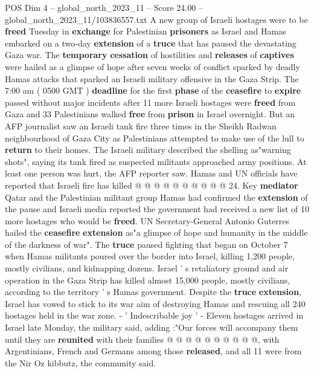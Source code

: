 \begin{textsample}{POS Dim 4 – global\_north\_2023\_11 – Score 24.00 – global\_north\_2023\_11/103836557.txt}  \label{ex:f4_pos_271}
A new group of Israeli hostages were to be \textbf{freed} Tuesday in \textbf{exchange} for Palestinian \textbf{prisoners} as Israel and Hamas embarked on a two-day \textbf{extension} of a \textbf{truce} that has paused the devastating Gaza war.
The \textbf{temporary} \textbf{cessation} of hostilities and \textbf{releases} of \textbf{captives} were hailed as a glimpse of hope after seven weeks of conflict sparked by deadly Hamas attacks that sparked an Israeli military offensive in the Gaza Strip.
The 7:00 am ( 0500 GMT ) \textbf{deadline} for the first \textbf{phase} of the \textbf{ceasefire} to \textbf{expire} passed without major incidents after 11 more Israeli hostages were \textbf{freed} from Gaza and 33 Palestinians walked \textbf{free} from \textbf{prison} in Israel overnight.
But an AFP journalist saw an Israeli tank fire three times in the Sheikh Radwan neighbourhood of Gaza City as Palestinians attempted to make use of the lull to \textbf{return} to their homes.
The Israeli military described the shelling as"warning shots", saying its tank fired as suspected militants approached army positions.
At least one person was hurt, the AFP reporter saw.
Hamas and UN officials have reported that Israeli fire has killed @ @ @ @ @ @ @ @ @ @ 24.
Key \textbf{mediator} Qatar and the Palestinian militant group Hamas had confirmed the \textbf{extension} of the pause and Israeli media reported the government had received a new list of 10 more hostages who would be \textbf{freed}.
UN Secretary-General Antonio Guterres hailed the \textbf{ceasefire} \textbf{extension} as"a glimpse of hope and humanity in the middle of the darkness of war".
The \textbf{truce} paused fighting that began on October 7 when Hamas militants poured over the border into Israel, killing 1,200 people, mostly civilians, and kidnapping dozens.
Israel ' s retaliatory ground and air operation in the Gaza Strip has killed almost 15,000 people, mostly civilians, according to the territory ' s Hamas government.
Despite the \textbf{truce} \textbf{extension}, Israel has vowed to stick to its war aim of destroying Hamas and rescuing all 240 hostages held in the war zone. - ' Indescribable joy ' - Eleven hostages arrived in Israel late Monday, the military said, adding :"Our forces will accompany them until they are \textbf{reunited} with their families @ @ @ @ @ @ @ @ @ @, with Argentinians, French and Germans among those \textbf{released}, and all 11 were from the Nir Oz kibbutz, the community said.

\end{textsample}
